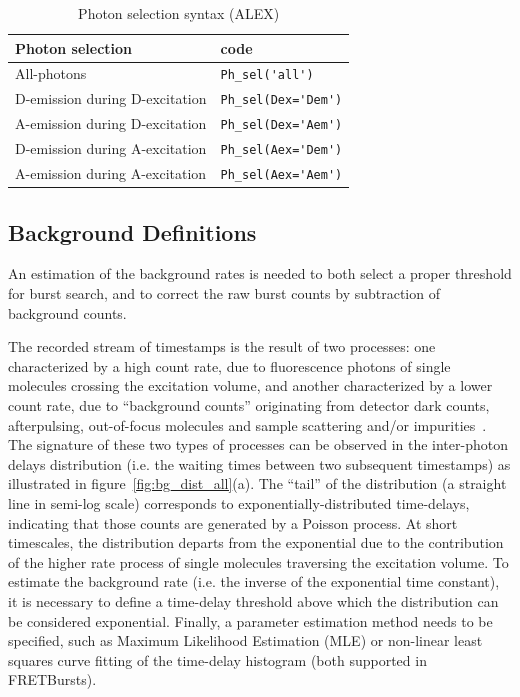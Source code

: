 \documentclass[10pt,letterpaper]{article}
\begin{document}
\begin{table}
\begin{tabular}{l|l}
  Photon selection  & code \\
  \hline
  All-photons & \verb|Ph_sel('all')|\\
  D-emission during D-excitation & \verb|Ph_sel(Dex='Dem')|\\
  A-emission during D-excitation & \verb|Ph_sel(Dex='Aem')|\\
  D-emission during A-excitation & \verb|Ph_sel(Aex='Dem')|\\
  A-emission during A-excitation & \verb|Ph_sel(Aex='Aem')|\\
\end{tabular}
\caption{\label{tab:ph_sel_alex}Photon selection syntax (ALEX)}
\end{table}

\subsection{Background Definitions}
\label{sec:bg_intro}

An estimation of the background rates is needed to both select a proper threshold for
burst search, and to correct the raw burst counts by subtraction of background counts.

The recorded stream of timestamps is the result of two processes: one characterized
by a high count rate, due to fluorescence photons of single molecules crossing the
excitation volume, and another characterized by a lower count rate, due to ``background
counts'' originating from detector dark counts, afterpulsing, out-of-focus molecules
and sample scattering and/or impurities~\cite{Edman_1996,Gopich_2008}.
The signature of these two types of processes can be
observed in the inter-photon delays distribution (i.e. the waiting times
between two subsequent timestamps) as illustrated in figure~\ref{fig:bg_dist_all}(a).
The ``tail'' of the distribution (a straight line in semi-log scale) corresponds
to exponentially-distributed time-delays, indicating that those counts are generated by a
Poisson process. At short
timescales, the distribution departs from the exponential due to the contribution
of the higher rate process of single molecules traversing the excitation volume.
To estimate the background rate (i.e. the inverse of the exponential time constant),
it is necessary to define a time-delay threshold above which the distribution
can be considered exponential.
Finally, a parameter estimation method needs to be specified, such as Maximum
Likelihood Estimation (MLE) or non-linear least squares curve fitting of 
the time-delay histogram (both supported in FRETBursts).
\end{document}
